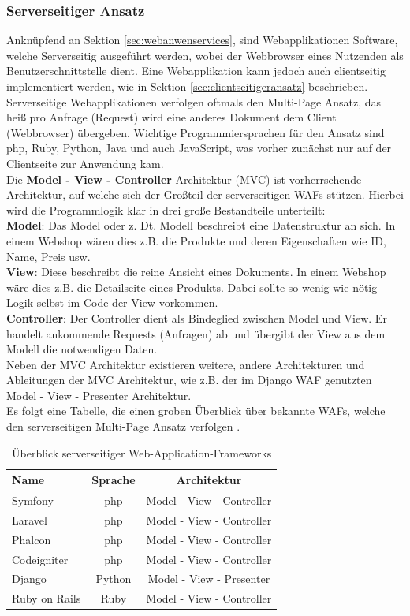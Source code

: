 \subsubsection{Serverseitiger Ansatz}\label{sec:serverseitgeransatz}
Anknüpfend an Sektion \ref{sec:webanwenservices}, sind Webapplikationen Software, welche Serverseitig ausgeführt werden, wobei der Webbrowser eines Nutzenden als Benutzerschnittstelle dient. Eine Webapplikation kann jedoch auch clientseitig implementiert werden, wie in Sektion \ref{sec:clientseitigeransatz} beschrieben. \\ 
Serverseitige Webapplikationen verfolgen oftmals den Multi-Page Ansatz, das heiß pro Anfrage (Request) wird eine anderes Dokument dem Client (Webbrowser) übergeben. Wichtige Programmiersprachen für den Ansatz sind php, Ruby, Python, Java und auch JavaScript, was vorher zunächst nur auf der Clientseite zur Anwendung kam. \\
Die \textbf{Model - View - Controller} Architektur (MVC) ist vorherrschende Architektur, auf welche sich der Großteil der serverseitigen WAFs stützen.
Hierbei wird die Programmlogik klar in drei große Bestandteile unterteilt: \\
\textbf{Model}: Das Model oder z. Dt. Modell beschreibt eine Datenstruktur an sich. In einem Webshop wären dies z.B. die Produkte und deren Eigenschaften wie ID, Name, Preis usw. \\
\textbf{View}: Diese beschreibt die reine Ansicht eines Dokuments. In einem Webshop wäre dies z.B. die Detailseite eines Produkts. Dabei sollte so wenig wie nötig Logik selbst im Code der View vorkommen. \\
\textbf{Controller}: Der Controller dient als Bindeglied zwischen Model und View. Er handelt ankommende Requests (Anfragen) ab und übergibt der View aus dem Modell die notwendigen Daten. \\ 
Neben der MVC Architektur existieren weitere, andere Architekturen und Ableitungen der MVC Architektur, wie z.B. der im Django WAF genutzten Model - View - Presenter Architektur. \\
Es folgt eine Tabelle, die einen groben Überblick über bekannte WAFs, welche den serverseitigen Multi-Page Ansatz verfolgen \cite{TopWebDe0:online}. 

\begin{table}[H]
	\centering
	\caption{Überblick serverseitiger Web-Application-Frameworks}
	\label{tab:servwaf}
	\begin{tabular}{lcc}
		\textbf{Name} & \textbf{Sprache} & \textbf{Architektur}   \\ 
		\hline 
		Symfony & php & Model - View - Controller \\
		Laravel	& php & Model - View - Controller  \\ 
		Phalcon	& php & Model - View - Controller   \\ 
		Codeigniter & php & Model - View - Controller \\
		Django & Python & Model - View - Presenter \\		
		Ruby on Rails & Ruby & Model - View - Controller \\
		\hline 
	\end{tabular} 
\end{table}


